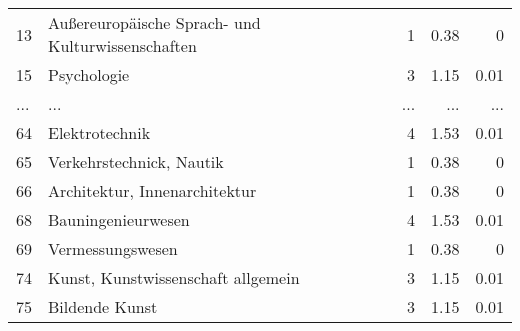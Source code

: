 \begin{longtable}{lXrrr}
        13 & \multicolumn{1}{X}{Außereuropäische Sprach- und Kulturwissenschaften} & %
          \num{1} &
          \num[round-mode=places,round-precision=2]{0.38} &
          \num[round-mode=places,round-precision=2]{0} \\
        15 & \multicolumn{1}{X}{Psychologie} & %
          \num{3} &
          \num[round-mode=places,round-precision=2]{1.15} &
          \num[round-mode=places,round-precision=2]{0.01} \\
       ... & ... & ... & ... & ... \\
        64 & \multicolumn{1}{X}{Elektrotechnik} & %
          \num{4} &
          \num[round-mode=places,round-precision=2]{1.53} &
          \num[round-mode=places,round-precision=2]{0.01} \\

        65 & \multicolumn{1}{X}{Verkehrstechnick, Nautik} & %
          \num{1} &
          \num[round-mode=places,round-precision=2]{0.38} &
          \num[round-mode=places,round-precision=2]{0} \\

        66 & \multicolumn{1}{X}{Architektur, Innenarchitektur} & %
          \num{1} &
          \num[round-mode=places,round-precision=2]{0.38} &
          \num[round-mode=places,round-precision=2]{0} \\

        68 & \multicolumn{1}{X}{Bauningenieurwesen} & %
          \num{4} &
          \num[round-mode=places,round-precision=2]{1.53} &
          \num[round-mode=places,round-precision=2]{0.01} \\

        69 & \multicolumn{1}{X}{Vermessungswesen} & %
          \num{1} &
          \num[round-mode=places,round-precision=2]{0.38} &
          \num[round-mode=places,round-precision=2]{0} \\

        74 & \multicolumn{1}{X}{Kunst, Kunstwissenschaft allgemein} & %
          \num{3} &
          \num[round-mode=places,round-precision=2]{1.15} &
          \num[round-mode=places,round-precision=2]{0.01} \\

        75 & \multicolumn{1}{X}{Bildende Kunst} & %
          \num{3} &
          \num[round-mode=places,round-precision=2]{1.15} &
          \num[round-mode=places,round-precision=2]{0.01} \\


\end{longtable}
